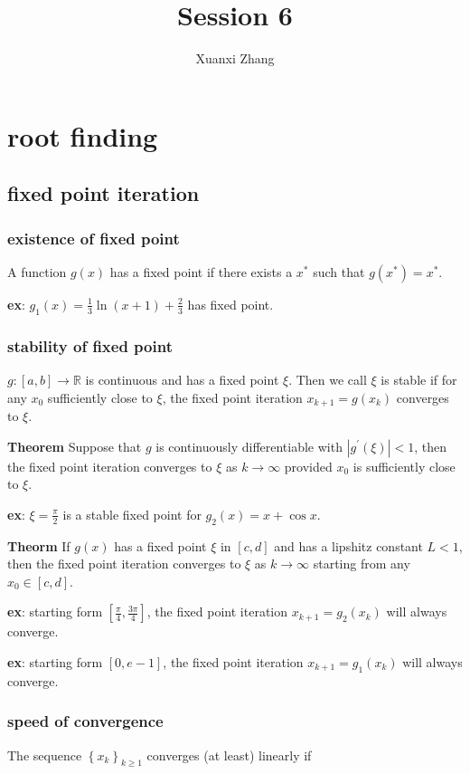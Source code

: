 \documentclass{article}%
\title{\huge Session 6\\
\normalsize}
\author{Xuanxi Zhang}
\begin{document}
\maketitle

\section{root finding}

\subsection{fixed point iteration}
\subsubsection{existence of fixed point}
A function $g(x)$ has a fixed point if there exists a $x^*$ such that $g(x^*)=x^*$.

\textbf{ex}: $g_1(x)=\frac{1}{3}\ln (x+1)+\frac{2}{3}$ has fixed point.

\subsubsection{stability of fixed point}
$g:[a, b] \rightarrow \mathbb{R}$  is continuous and has a fixed point $\xi$. Then we call $\xi$ is stable if for any $x_0$ sufficiently close to $\xi$, the fixed point iteration $x_{k+1}=g(x_k)$ converges to $\xi$.

\textbf{Theorem}  Suppose that $g$ is continuously differentiable with $\left|g^{\prime}(\xi)\right|<1$, then the fixed point iteration converges to $\xi$ as $k \rightarrow \infty$ provided $x_0$ is sufficiently close to $\xi$.

\textbf{ex}: $\xi=\frac{\pi}{2}$ is a stable fixed point for $g_2(x)=x+\cos x$.

\textbf{Theorm} If $g(x)$ has a fixed point $\xi$ in $[c,d]$ and has a lipshitz constant $L<1$, then the fixed point iteration converges to $\xi$ as $k \rightarrow \infty$ starting from any $x_0\in [c,d]$.

\textbf{ex}: starting form $[\frac{\pi}{4},\frac{3\pi}{4}]$, the fixed point iteration $x_{k+1}=g_2(x_k)$ will always converge.

\textbf{ex}: starting form $[0,e-1]$, the fixed point iteration $x_{k+1}=g_1(x_k)$ will always converge.

\subsubsection{speed of convergence}
The sequence $\left\{x_k\right\}_{k \geq 1}$ converges (at least) linearly if
\end{document}
